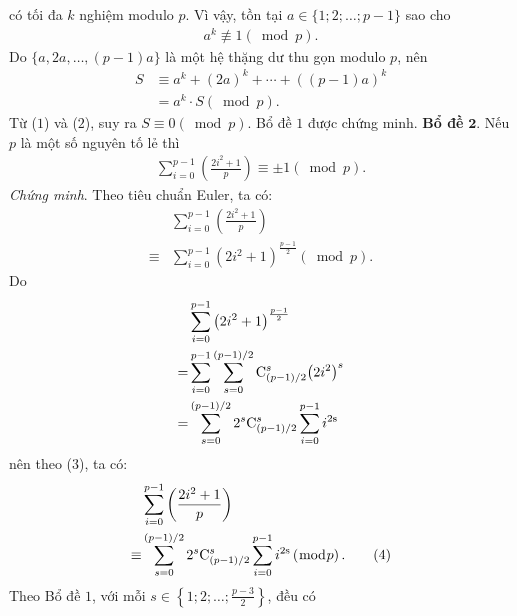 \begin{multicols}{2}
	có tối đa $k$ nghiệm modulo $p$. Vì vậy, tồn tại $a \in \{1; 2; \ldots; p - 1\}$ sao cho
	\begin{align*}
		{a^k}\not  \equiv 1\left( {\bmod p} \right). \tag{$1$}
	\end{align*}
	Do $\{a, 2a, \ldots, (p - 1)a\}$ là một hệ thặng dư thu gọn modulo $p$, nên
	\begin{align*}
		S &\equiv {a^k} + {\left( {2a} \right)^k} +  \cdots  + {\left( {\left( {p - 1} \right)a} \right)^k} \\
		&= {a^k} \cdot S\left( {\bmod p} \right). \tag{$2$}
	\end{align*}
	Từ ($1$) và ($2$), suy ra $S \equiv 0\left( {\bmod p} \right)$.
	\vskip 0.05cm 
	Bổ đề $1$ được chứng minh.
	\vskip 0.05cm
	\textbf{\color{thachthuctoanhoc}Bổ đề} $\pmb{2.}$ Nếu $p$ là một số nguyên tố lẻ thì
	\begin{align*}
		\sum\limits_{i = 0}^{p - 1} {\left( {\frac{{2{i^2} + 1}}{p}} \right)}  \equiv  \pm 1\left( {\bmod p} \right).
	\end{align*}
	\textit{Chứng minh}. Theo tiêu chuẩn Euler, ta có:
	\begin{align*}
		&\sum\limits_{i = 0}^{p - 1} {\left( {\frac{{2{i^2} + 1}}{p}} \right)} \\ \equiv &\sum\limits_{i = 0}^{p - 1} {{{\left( {2{i^2} + 1} \right)}^{\frac{{p - 1}}{2}}}} \left( {\bmod p} \right). \tag{$3$}	
	\end{align*}
	Do
	\begin{align*}
		&\sum\limits_{i = 0}^{p - 1} {{{\left( {2{i^2} + 1} \right)}^{\frac{{p - 1}}{2}}}}  \\
		= &\sum\limits_{i = 0}^{p - 1} {\sum\limits_{s = 0}^{\left( {p - 1} \right)/2} {{\rm{C}}_{\left( {p - 1} \right)/2}^s{{\left( {2{i^2}} \right)}^s}} }  \\
		= &\sum\limits_{s = 0}^{\left( {p - 1} \right)/2} {{2^s}{\rm{C}}_{\left( {p - 1} \right)/2}^s\sum\limits_{i = 0}^{p - 1} {{i^{2{\rm{s}}}}} }
	\end{align*}
	nên theo ($3$), ta có:
	\begin{align*}
		&\sum\limits_{i = 0}^{p - 1} {\left( {\frac{{2{i^2} + 1}}{p}} \right)} \\ \equiv &\sum\limits_{s = 0}^{\left( {p - 1} \right)/2} {{2^s}{\rm{C}}_{\left( {p - 1} \right)/2}^s\sum\limits_{i = 0}^{p - 1} {{i^{2{\rm{s}}}}} } \left( {\bmod p} \right). \tag{$4$}
	\end{align*}
	Theo Bổ đề $1$, với mỗi $s \in \left\{ {1;2; \ldots ;\frac{{p - 3}}{2}} \right\}$,  đều có
	\begin{align*}

\end{align*}
\end{multicols}
